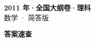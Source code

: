 \documentclass[zihao=-4, a4paper]{ctexart}
\begin{document}
\begin{center}
  {\Large\bfseries 2011 年·全国大纲卷·理科}\\[4pt]
  {\large 数学 · 简答版}
\end{center}
\medskip
{}

\clearpage
{}
\begin{center}{\Large\bfseries 答案速查}\end{center}
\medskip

\end{document}
